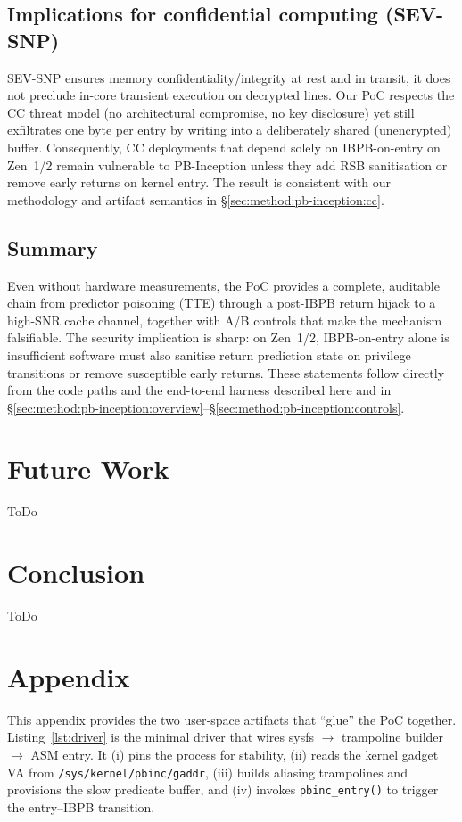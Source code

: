 \documentclass[11pt,a4paper]{article}
\begin{document}
\subsection{Implications for confidential computing (SEV-SNP)}
SEV-SNP ensures memory confidentiality/integrity at rest and in transit, it does not preclude in-core transient execution on decrypted lines. Our PoC respects the CC threat model (no architectural compromise, no key disclosure) yet still exfiltrates one byte per entry by writing into a deliberately shared (unencrypted) buffer. Consequently, CC deployments that depend solely on IBPB-on-entry on Zen~1/2 remain vulnerable to PB-Inception unless they add RSB sanitisation or remove early returns on kernel entry. The result is consistent with our methodology and artifact semantics in \S\ref{sec:method:pb-inception:cc}.\cite{wikner2025breaking,linux_srso_doc}

\subsection{Summary}
Even without hardware measurements, the PoC provides a complete, auditable chain from predictor poisoning (TTE) through a post-IBPB return hijack to a high-SNR cache channel, together with A/B controls that make the mechanism falsifiable. The security implication is sharp: on Zen~1/2, IBPB-on-entry alone is insufficient software must also sanitise return prediction state on privilege transitions or remove susceptible early returns. These statements follow directly from the code paths and the end-to-end harness described here and in \S\ref{sec:method:pb-inception:overview}--\S\ref{sec:method:pb-inception:controls}.\cite{wikner2025breaking,trujillo2023inception,linux_srso_doc,linux_rsb_doc}

\section{Future Work}
ToDo


\section{Conclusion}
ToDo



\section{Appendix}
This appendix provides the two user‑space artifacts that “glue” the PoC together. 
Listing~\ref{lst:driver} is the minimal driver that wires sysfs $\rightarrow$ 
trampoline builder $\rightarrow$ ASM entry. It (i) pins the process for stability, 
(ii) reads the kernel gadget VA from \texttt{/sys/kernel/pbinc/gaddr}, 
(iii) builds aliasing trampolines and provisions the slow predicate buffer, and 
(iv) invokes \texttt{pbinc\_entry()} to trigger the entry–IBPB transition.
\end{document}
